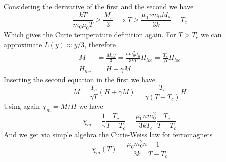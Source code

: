 \documentclass[../electromagnetism.tex]{subfiles}
\begin{document}
Considering the derivative of the first and the second we have
\begin{equation*}
	\frac{kT}{m_0\mu_0T}\ge\frac{M_s}{3}\implies T\ge\frac{\mu_0\gamma m_0M_s}{3k}=T_c
\end{equation*}
Which gives the Curie temperature definition again. For $T>T_c$ we can approximate $L(y)\approx y/3$, therefore
\begin{equation}
	\begin{aligned}
		M&=\frac{M_sy}{3}=\frac{nm_0^2\mu_0}{3kT}H_{loc}=\frac{T_c}{\gamma T}H_{loc}\\
		H_{loc}&=H+\gamma M
	\end{aligned}
	\label{eq:hightempfmag}
\end{equation}
Inserting the second equation in the first we have
\begin{equation*}
	M=\frac{T_c}{\gamma T}\left( H+\gamma M \right)=\frac{T_c}{\gamma\left( T-T_c \right)}H
\end{equation*}
Using again $\chi_m=M/H$ we have
\begin{equation*}
	\chi_m=\frac{1}{\gamma}\frac{T_c}{T-T_c}=\frac{\mu_0nm_0^2}{3kT_c}\frac{T_c}{T-T_c}
\end{equation*}
And we get via simple algebra the Curie-Weiss law for ferromagnets
\begin{equation*}
	\chi_m(T)=\frac{\mu_0m_0^2n}{3k}\frac{1}{T-T_c}
\end{equation*}
\end{document}
